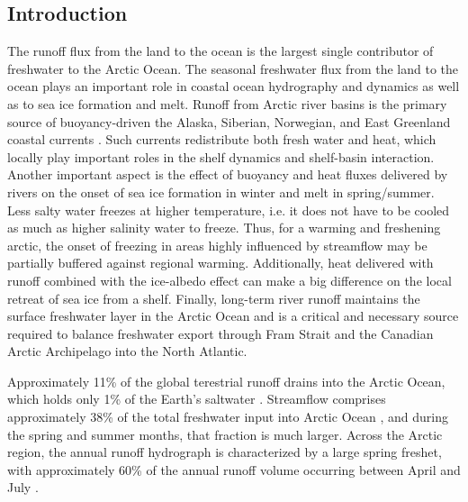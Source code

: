 \documentclass[ms, draft]{agutex}
\begin{document}
%

\begin{article}

%
%

\section{Introduction}

The runoff flux from the land to the ocean is the largest single contributor of freshwater to the Arctic Ocean.
The seasonal freshwater flux from the land to the ocean plays an important role in coastal ocean hydrography and dynamics as well as to sea ice formation and melt.
Runoff from Arctic river basins is the primary source of buoyancy-driven the Alaska, Siberian, Norwegian, and East Greenland coastal currents \citep[e.g.][]{Morison_2000,Boyd_2002,McGeehan_2012}.
Such currents redistribute both fresh water and heat, which locally play important roles in the shelf dynamics and shelf-basin interaction.
Another important aspect is the effect of buoyancy and heat fluxes delivered by rivers on the onset of sea ice formation in winter and melt in spring/summer.
Less salty water freezes at higher temperature, i.e. it does not have to be cooled as much as higher salinity water to freeze.
Thus, for a warming and freshening arctic, the onset of freezing in areas highly influenced by streamflow may be partially buffered against regional warming.
Additionally, heat delivered with runoff combined with the ice-albedo effect can make a big difference on the local retreat of sea ice from a shelf.
Finally, long-term river runoff maintains the surface freshwater layer in the Arctic Ocean and is a critical and necessary source required to balance freshwater export through Fram Strait and the Canadian Arctic Archipelago into the North Atlantic.

Approximately 11\% of the global terestrial runoff drains into the Arctic Ocean, which holds only 1\% of the Earth's saltwater \citep{Lewis_2000,Lammers_2001}.
Streamflow comprises approximately 38\% of the total freshwater input into Arctic Ocean \cite{Serreze_2006}, and during the spring and summer months, that fraction is much larger.
Across the Arctic region, the annual runoff hydrograph is characterized by a large spring freshet, with approximately 60\% of the annual runoff volume occurring between April and July \citep{Lammers_2001}.


\end{article}
\end{document}
